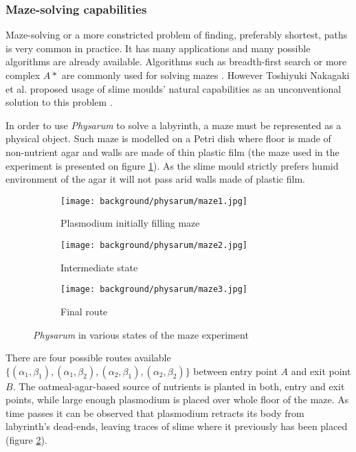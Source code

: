 \subsubsection{Maze-solving capabilities}

Maze-solving or a more constricted problem of finding, preferably shortest, paths is very common in practice. It has many applications and many possible algorithms are already available. Algorithms such as breadth-first search or more complex $A*$ are commonly used for solving mazes \cite{zelkowitz1979principles}. However Toshiyuki Nakagaki et al. proposed usage of slime moulds' natural capabilities as an unconventional solution to this problem \cite{nakagaki2000intelligence}.

In order to use \textit{Physarum} to solve a labyrinth, a maze must be represented as a physical object. Such maze is modelled on a Petri dish where floor is made of non-nutrient agar and walls are made of thin plastic film (the maze used in the experiment is presented on figure \ref{figure:bp_maze_initial}). As the slime mould strictly prefers humid environment of the agar it will not pass arid walls made of plastic film. 

\begin{figure}
  \centering
  \begin{subfigure}{0.45\textwidth}
    \centering
    \texttt{[image: background/physarum/maze1.jpg]}
    \caption{Plasmodium initially filling maze}
    \label{figure:bp_maze_initial}
  \end{subfigure}
  \begin{subfigure}{0.45\textwidth}
    \centering
    \texttt{[image: background/physarum/maze2.jpg]}
    \caption{Intermediate state}
    \label{figure:bp_maze_intermediate}
  \end{subfigure}
  \begin{subfigure}{0.45\textwidth}
    \centering
    \texttt{[image: background/physarum/maze3.jpg]}
    \caption{Final route}
    \label{figure:bp_maze_final}
  \end{subfigure}
  \caption{\textit{Physarum} in various states of the maze experiment \cite{nakagaki2000intelligence}}
\end{figure}

There are four possible routes available $\{(\alpha_1,\beta_1), (\alpha_1,\beta_2), (\alpha_2,\beta_1), (\alpha_2,\beta_2)\}$ between entry point $A$ and exit point $B$. The oatmeal-agar-based source of nutrients is planted in both, entry and exit points, while large enough plasmodium is placed over whole floor of the maze. As time passes it can be observed that plasmodium retracts its body from labyrinth's dead-ends, leaving traces of slime where it previously has been placed (figure \ref{figure:bp_maze_intermediate}). 

